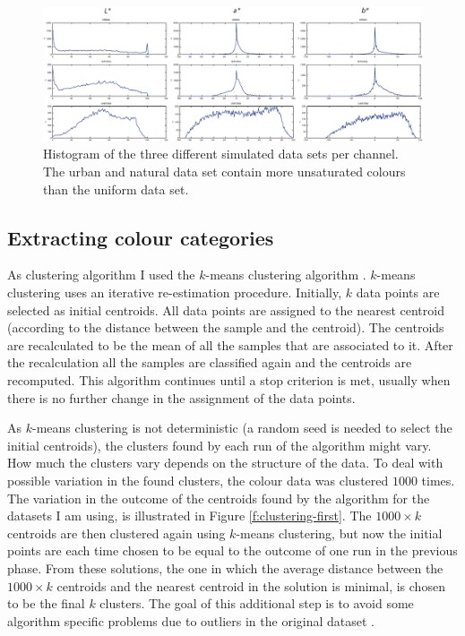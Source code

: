 \begin{figure}[htbp]
\centering
\includegraphics[width=\textwidth]{./experiments/figures/data-sets-histogram.pdf}
\caption[Histogram of three different simulated data sets per
channel]{Histogram of the three different simulated data sets per
  channel. The urban and natural data set contain more unsaturated
  colours than the uniform data set.}
\label{f:data-sets-histogram}
\end{figure}

\subsection{Extracting colour categories}

As clustering algorithm I used the $k$-means clustering algorithm
\citep{lloyd82least}. $k$-means clustering uses an iterative
re-estimation procedure. Initially, $k$ data points are selected as
initial centroids. All data points are assigned to the nearest
centroid (according to the distance between the sample and the
centroid). The centroids are recalculated to be the mean of all the
samples that are associated to it.  After the recalculation all the
samples are classified again and the centroids are recomputed. This
algorithm continues until a stop criterion is met, usually when there
is no further change in the assignment of the data points.

As $k$-means clustering is not deterministic (a random seed is needed
to select the initial centroids), the clusters found by each run of
the algorithm might vary. How much the clusters vary depends on the
structure of the data. To deal with possible variation in the found
clusters, the colour data was clustered $1000$ times. The variation in
the outcome of the centroids found by the algorithm for the datasets I
am using, is illustrated in Figure \ref{f:clustering-first}. The $1000
\times k$ centroids are then clustered again using $k$-means
clustering, but now the initial points are each time chosen to be
equal to the outcome of one run in the previous phase. From these
solutions, the one in which the average distance between the $1000
\times k$ centroids and the nearest centroid in the solution is
minimal, is chosen to be the final $k$ clusters. The goal of this
additional step is to avoid some algorithm specific problems due to
outliers in the original dataset \citep{bradley98refining}.

